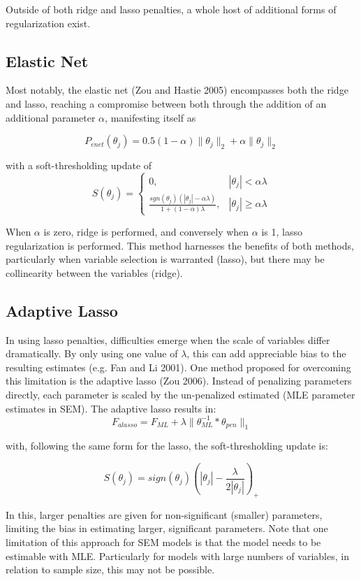 \documentclass[article]{jss}
\begin{document}
Outside of both ridge and lasso penalties, a whole host of additional
forms of regularization exist.

\subsection{Elastic Net}\label{elastic-net}

Most notably, the elastic net (Zou and Hastie 2005) encompasses both the
ridge and lasso, reaching a compromise between both through the addition
of an additional parameter \(\alpha\), manifesting itself as

\[
P_{enet}(\theta_{j}) = 0.5(1-\alpha)\| \theta_{j} \|_{2} + \alpha\| \theta_{j} \|_{2}
\]

with a soft-thresholding update of \[
S(\theta_{j})= 
\begin{cases}
0,&  |\theta_{j}| < \alpha\lambda\\
\frac{sgn(\theta_{j})(|\theta_{j}|-\alpha\lambda)}{1+(1-\alpha)\lambda},              & |\theta_{j}|\geq\alpha\lambda
\end{cases}
\]

When \(\alpha\) is zero, ridge is performed, and conversely when
\(\alpha\) is 1, lasso regularization is performed. This method
harnesses the benefits of both methods, particularly when variable
selection is warranted (lasso), but there may be collinearity between
the variables (ridge).

\subsection{Adaptive Lasso}\label{adaptive-lasso}

In using lasso penalties, difficulties emerge when the scale of
variables differ dramatically. By only using one value of \(\lambda\),
this can add appreciable bias to the resulting estimates (e.g. Fan and
Li 2001). One method proposed for overcoming this limitation is the
adaptive lasso (Zou 2006). Instead of penalizing parameters directly,
each parameter is scaled by the un-penalized estimated (MLE parameter
estimates in SEM). The adaptive lasso results in: \[
F_{alasso} = F_{ML} + \lambda \| \theta_{ML}^{-1} * \theta_{pen} \|_{1}
\]

with, following the same form for the lasso, the soft-thresholding
update is:

\[
S(\theta_{j})= sign(\theta_{j})(|\theta_{j}|-\frac{\lambda}{2|\theta_{j}|})_{+}
\]

In this, larger penalties are given for non-significant (smaller)
parameters, limiting the bias in estimating larger, significant
parameters. Note that one limitation of this approach for SEM models is
that the model needs to be estimable with MLE. Particularly for models
with large numbers of variables, in relation to sample size, this may
not be possible.
\end{document}
